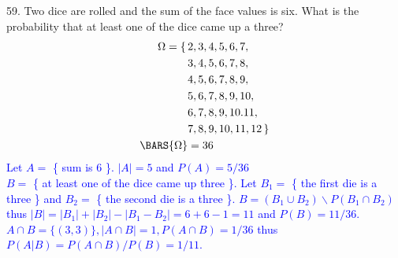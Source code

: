 \documentclass[10pt,a4paper]{report}
\newcommand{\BLUE}[1]{\textcolor{blue}{#1}}
\begin{document}
59.  Two dice are rolled and the sum of the face values is six.  What is the probability that at least one of the dice came up a three?
	\BLUE{ 
	\begin{align*}
		\Omega = \{\, &2,3,4,5,6,7, \\
			&3,4,5,6,7,8, \\
			&4,5,6,7,8,9, \\
			&5,6,7,8,9,10, \\
			&6,7,8,9,10.11, \\
			&7,8,9,10,11,12\,
		\}\\
		\BARS{\Omega} &= 36
	\end{align*} Let $A = $ \{ sum is 6 \}.  $|A| = 5$ and $P(A) = 5/36$\\
 $B = $ \{ at least one of the dice came up three \}. 
Let $B_1 =$ \{ the first die is a three \} and $B_2 = $ \{ the second die is a three \}.  $B = (B_1 \cup B_2 )\backslash P(B_1 \cap B_2)$ thus $|B| = |B_1| + |B_2| - |B_1 - B_2| = 6+6-1 = 11$ and $P(B) = 11/36$.\\
$A\cap B = \{ (3,3) \}, |A\cap B| = 1, P(A\cap B) = 1/36$  thus $P(A|B) = P(A\cap B)/P(B) = 1/11$.
	}
\end{document}
